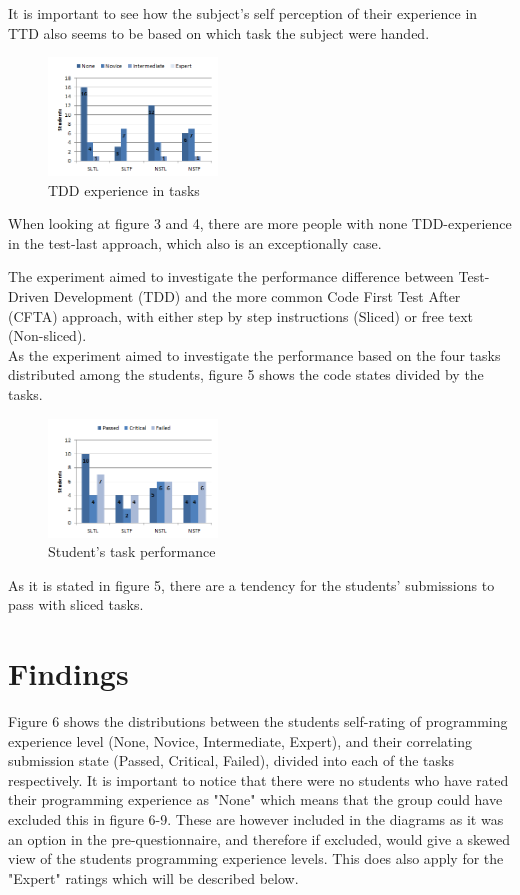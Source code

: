 \documentclass{sig-alternate-05-2015}
\begin{document}
It is important to see how the subject's self perception of their experience in TTD also seems to be based on which task the subject were handed.

\begin{figure}[H]
	\centering
	\includegraphics[width=0.4\textwidth]{img04}
	\caption{TDD experience in tasks}
\end{figure}

When looking at figure 3 and 4, there are more people with none TDD-experience in the test-last approach, which also is an exceptionally case.

The experiment aimed to investigate the performance difference between Test-Driven Development (TDD) and the more common Code First Test After (CFTA) approach, with either step by step instructions (Sliced) or free text (Non-sliced).\\

As the experiment aimed to investigate the performance based on the four tasks distributed among the students, figure 5 shows the code states divided by the tasks.

\begin{figure}[H]
	\centering
	\includegraphics[width=0.4\textwidth]{img05}
	\caption{Student's task performance}
\end{figure}

As it is stated in figure 5, there are a tendency for the students' submissions to pass with sliced tasks.

\section{Findings}

Figure 6 shows the distributions between the students self-rating of programming experience level (None, Novice, Intermediate, Expert), and their correlating submission state (Passed, Critical, Failed), divided into each of the tasks respectively.
It is important to notice that there were no students who have rated their programming experience  as "None" which means that the group could have excluded this in figure 6-9. These are however included in the diagrams as it was an option in the pre-questionnaire, and therefore if excluded, would give a skewed view of the students programming experience levels. This does also apply for the "Expert" ratings which will be described below.
\end{document}

